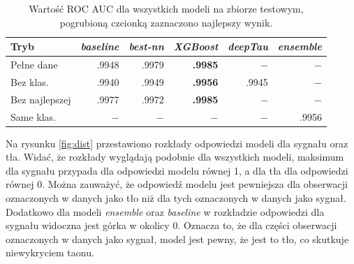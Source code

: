 \documentclass{pracalicmgr}
\begin{document}
	
	\begin{table}[H]
	\centering
	\caption{Wartość ROC AUC dla wszystkich modeli na zbiorze testowym, pogrubioną czcionką zaznaczono najlepszy wynik.}
	\label{tab:wyniki}
	\begin{tabular}{lrrrrr}
	\toprule
	Tryb & \textit{baseline} & \textit{best-nn} & \textit{XGBoost} & \textit{deepTau} & \textit{ensemble} \\
	\midrule
	Pełne dane & .9948 & .9979 & \textbf{.9985} & $-$ & $-$ \\
	Bez klas. & .9940 & .9949 & \textbf{.9956} & .9945 & $-$  \\
	Bez najlepszej & .9977 & .9972 & \textbf{.9985} & $-$ & $-$ \\
	Same klas. & $-$ & $-$ & $-$ & $-$ & .9956 \\
	\bottomrule
	\end{tabular}
	\end{table}
	
	Na rysunku \ref{fig:dist} przestawiono rozkłady odpowiedzi modeli dla sygnału oraz tła. Widać, że rozkłady wyglądają podobnie dla wszystkich modeli, maksimum dla sygnału przypada dla odpowiedzi modelu równej 1, a dla tła dla odpowiedzi równej 0. Można zauważyć, że odpowiedź modelu jest pewniejsza dla obserwacji oznaczonych w danych jako tło niż dla tych oznaczonych w danych jako sygnał. Dodatkowo dla modeli \textit{ensemble} oraz \textit{baseline} w rozkładzie odpowiedzi dla sygnału widoczna jest górka w okolicy 0. Oznacza to, że dla części obserwacji oznaczonych w danych jako sygnał, model jest pewny, że jest to tło, co skutkuje niewykryciem taonu.
\end{document}

